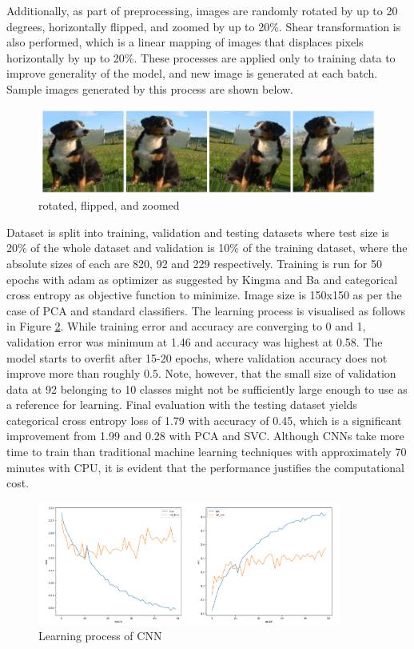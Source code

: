 \documentclass[11pt,titlepage,oneside,openany]{article}
\begin{document}
Additionally, as part of preprocessing, images are randomly rotated by up to 20 degrees, horizontally flipped, and zoomed by up to 20\%. Shear transformation is also performed, which is a linear mapping of images that displaces pixels horizontally by up to 20\%. These processes are applied only to training data to improve generality of the model, and new image is generated at each batch. Sample images generated by this process are shown below.

\begin{figure}[h]
	\centering
	\includegraphics[width=12cm]{trans}
	\caption{rotated, flipped, and zoomed}
	\label{fig:trans}
\end{figure}

Dataset is split into training, validation and testing datasets where test size is 20\% of the whole dataset and validation is 10\% of the training dataset, where the absolute sizes of each are 820, 92 and 229 respectively. Training is run for 50 epochs with adam as optimizer as suggested by Kingma and Ba \cite{KB14} and categorical cross entropy as objective function to minimize. Image size is 150x150 as per the case of PCA and standard classifiers. The learning process is visualised as follows in Figure \ref{fig:learn}. While training error and accuracy are converging to 0 and 1, validation error was minimum at 1.46 and accuracy was highest at 0.58. The model starts to overfit after 15-20 epochs, where validation accuracy does not improve more than roughly 0.5.  
Note, however, that the small size of validation data at 92 belonging to 10 classes might not be sufficiently large enough to use as a reference for learning. Final evaluation with the testing dataset yields categorical cross entropy loss of 1.79 with accuracy of 0.45, which is a significant improvement from 1.99 and 0.28 with PCA and SVC. Although CNNs take more time to train than traditional machine learning techniques with approximately 70 minutes with CPU, it is evident that the performance justifies the computational cost. 

\begin{figure}[h]
	\centering
	\includegraphics[width=10cm]{learning}
	\caption{Learning process of CNN}
	\label{fig:learn}
\end{figure}
\end{document}
